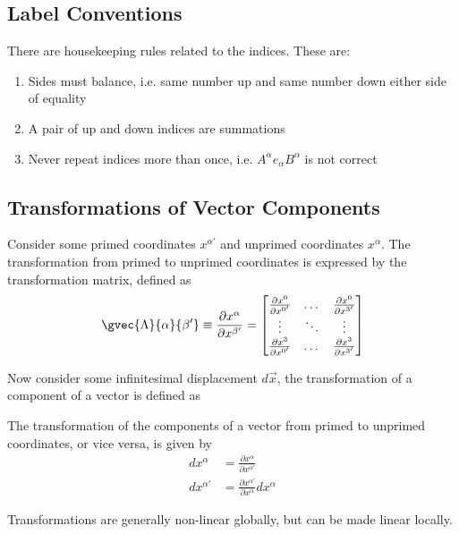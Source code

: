 \subsection{Label Conventions}
There are housekeeping rules related to the indices. These are:
\begin{enumerate}
    \item Sides must balance, i.e. same number up and same number down either side of equality
    \item A pair of up and down indices are summations
    \item Never repeat indices more than once, i.e. $A^\alpha e_\alpha B^\alpha$ is not correct
\end{enumerate}

\subsection{Transformations of Vector Components}
Consider some primed coordinates $x^{\alpha'}$ and unprimed coordinates $x^\alpha$. The transformation from primed to unprimed coordinates is expressed by the transformation matrix, defined as 
$$ \gvec{\Lambda}{\alpha}{\beta'} \equiv \frac{\partial x^\alpha}{\partial x^{\beta'}} = 
\begin{bmatrix}
    \frac{\partial x^0}{\partial x^{0'}} & \dots & \frac{\partial x^0}{\partial x^{3'}} \\  \vdots & \ddots & \vdots \\ \frac{\partial x^3}{\partial x^{0'}} & \dots & \frac{\partial x^3}{\partial x^{3'}}
\end{bmatrix}
$$

\par Now consider some infinitesimal displacement $d\vec{x}$, the transformation of a component of a vector is defined as
\begin{definition}
    The transformation of the components of a vector from primed to unprimed coordinates, or vice versa, is given by
    \begin{align*}
        dx^\alpha & = \frac{\partial x^\alpha}{\partial x^{\alpha'}} \\ dx^{\alpha'} & = \frac{\partial x^{\alpha'}}{\partial x^\alpha} dx^\alpha
    \end{align*}
\end{definition}

\par Transformations are generally non-linear globally, but can be made linear locally.

